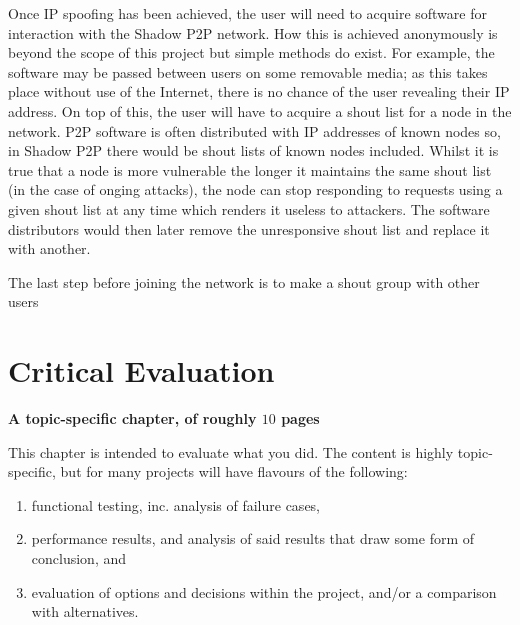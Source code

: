 \documentclass[ %
                    author={Luke Murray},
                supervisor={Dr. Simon Hollis},
                     title={Shadow Peer-to-Peer Networks},
                  subtitle={},
                    degree={MEng},
                      year={2013} ]{thesis}
\begin{document}

Once IP spoofing has been achieved, the user will need to acquire software for interaction with the Shadow P2P network. How this is achieved anonymously is beyond the scope of this project but simple methods do exist. For example, the software may be passed between users on some removable media; as this takes place without use of the Internet, there is no chance of the user revealing their IP address. On top of this, the user will have to acquire a shout list for a node in the network. P2P software is often distributed with IP addresses of known nodes so, in Shadow P2P there would be shout lists of known nodes included. Whilst it is true that a node is more vulnerable the longer it maintains the same shout list (in the case of onging attacks), the node can stop responding to requests using a given shout list at any time which renders it useless to attackers. The software distributors would then later remove the unresponsive shout list and replace it with another. 

The last step before joining the network is to make a shout group with other users



\chapter{Critical Evaluation}
\label{chap:evaluation}

{\bf A topic-specific chapter, of roughly $10$ pages} 
\vspace{1cm} 

\noindent
This chapter is intended to evaluate what you did.  The content is highly 
topic-specific, but for many projects will have flavours of the following:

\begin{enumerate}
\item functional testing, inc. analysis of failure cases,
\item performance results, and analysis of said results that draw some 
      form of conclusion,
      and
\item evaluation of options and decisions within the project, and/or a
      comparison with alternatives.
\end{enumerate}
\end{document}
